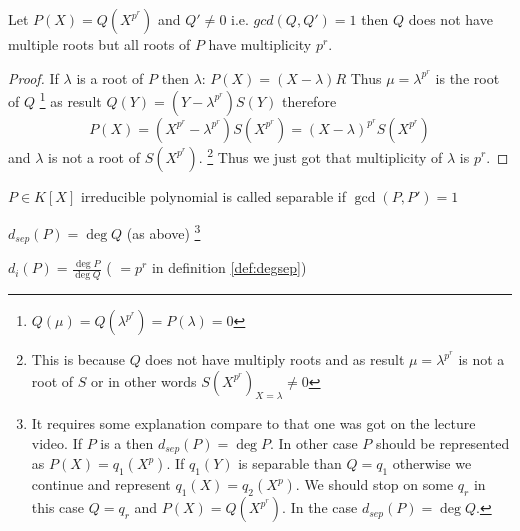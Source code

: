 \begin{proposition}
  Let $P\left(X\right) = Q\left(X^{p^r}\right)$ and $Q' \ne 0$ i.e.
  $gcd(Q, Q') = 1$ then $Q$ does not have multiple roots but
  all roots of $P$ have multiplicity $p^r$.
  \begin{proof}
    If $\lambda$ is a root of $P$ then $\lambda$:
    $P(X) = (X - \lambda)R$
    Thus $\mu = \lambda^{p^r}$ is the root of $Q$
    \footnote{
      $Q\left(\mu\right) = Q\left(\lambda^{p^r}\right) =
      P\left(\lambda\right) = 0$
    }
    as result
    $Q(Y) = (Y - \lambda^{p^r}) S(Y)$ therefore
    \[
    P(X) =
    \left(X^{p^r} - \lambda^{p^r}\right)S\left(X^{p^r}\right) =
    \left(X - \lambda\right)^{p^r}S\left(X^{p^r}\right)
    \]
    and $\lambda$ is not a root of $S\left(X^{p^r}\right)$.
    \footnote{
      This is because $Q$ does not have multiply roots and as result
      $\mu = \lambda^{p^r}$ is not a root of $S$ or in other words
      $S\left(X^{p^r}\right)_{X=\lambda} \ne 0$
      }
    Thus we just got that multiplicity of $\lambda$ is $p^r$.
  \end{proof}
  \label{prop:lect3_1}
\end{proposition}

\begin{definition}
  $P\in K\left[X\right]$ irreducible polynomial is called separable if
  $\gcd\left(P, P'\right) = 1$
  \label{def:separablepolynomial}
\end{definition}

\begin{definition}
  $d_{sep}(P) = \deg Q$ (as above)
  \footnote{    
    It requires some explanation compare to that one was got on the
    lecture video.
    If $P$ is a  then
    $d_{sep}(P) = \deg P$. In other case $P$ should be represented as
    $P\left(X\right) = q_1(X^p)$. If $q_1\left(Y\right)$ is separable
    than $Q = q_1$ otherwise we continue and represent
    $q_1\left(X\right) = q_2\left(X^p\right)$. We should stop on some
    $q_r$ in this case $Q = q_r$ and $P\left(X\right) =
    Q\left(X^{p^r}\right)$. In the case $d_{sep}(P) = \deg Q$.
  }
  \label{def:degsep}
\end{definition}

\begin{definition}
  $d_{i}(P) = \frac{\deg P}{\deg Q}$ ( $=p^r$ in definition
  \ref{def:degsep}) 
  \label{def:deginsep}
\end{definition}

